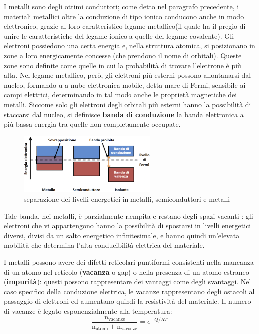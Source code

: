 I metalli sono degli ottimi conduttori; come detto nel paragrafo precedente, i materiali metallici oltre la conduzione di tipo ionico conducono anche in modo elettronico, grazie al loro caratteristico legame metallico(il quale ha il pregio di unire le caratteristiche del legame ionico a quelle del legame covalente).
Gli elettroni possiedono una certa energia e, nella struttura atomica, si posizionano in zone a loro energicamente concesse (che prendono il nome di orbitali). Queste zone sono definite come quelle in cui la probabilità di trovare l'elettrone è più alta. 
\newline {}
Nel legame metallico, però, gli elettroni più esterni possono allontanarsi dal nucleo, formando u a nube elettronica mobile, detta mare di Fermi, sensibile ai campi elettrici, determinando in tal modo anche le proprietà magnetiche dei metalli.
Siccome solo gli elettroni degli orbitali più esterni hanno la possibilità di staccarsi dal nucleo, si definisce \textbf{banda di conduzione} la banda elettronica a più bassa energia tra quelle non completamente occupate.

\begin{figure}[!hbt]
	\includegraphics[width=0.6\textwidth]{images/img1.png}
	\caption[Banda di valenza]{separazione dei livelli energetici in metalli, semiconduttori e metalli}
\end{figure}

Tale banda, nei metalli, è parzialmente riempita e restano degli spazi vacanti : gli elettroni che vi appartengono hanno la possibilità di spostarsi in livelli energetici diversi, divisi da un salto energetico infinitesimale, e hanno quindi un'elevata mobilità che determina l'alta conducibilità elettrica del materiale.

I metalli possono avere dei difetti reticolari puntiformi consistenti nella mancanza di un atomo nel reticolo (\textbf{vacanza} o gap) o nella presenza di un atomo estraneo (\textbf{impurità}): questi possono rappresentare dei vantaggi come degli svantaggi. Nel caso specifico della conduzione elettrica, le vacanze rappresentano degli ostacoli al passaggio di elettroni ed aumentano quindi la resistività del materiale. Il numero di vacanze è legato esponenzialmente alla temperatura: 
\begin{equation*}
    \frac{\mathrm{n_{vacanze}}}{\mathrm{n_{ atomi}+n_{vacanze}}} = e^{-Q/RT}
\end{equation*}

